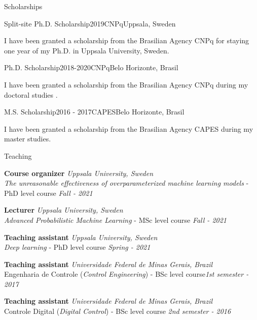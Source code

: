 \documentclass{resume} %
\begin{document}
\newpage

\begin{rSection}{Scholarships}

\begin{rSubsection}{Split-site Ph.D. Scholarship}{2019}{CNPq}{Uppsala, Sweden}

\item I have been granted a scholarship from the Brasilian Agency CNPq for staying one year  of my Ph.D. in Uppsala University, Sweden.
\end{rSubsection}


\begin{rSubsection}{Ph.D. Scholarship}{2018-2020}{CNPq}{Belo Horizonte, Brasil}

\item I have been granted a scholarship from the Brasilian Agency CNPq during my doctoral studies .
\end{rSubsection}


\begin{rSubsection}{M.S. Scholarship}{2016 - 2017}{CAPES}{Belo Horizonte, Brasil}

\item  I have been granted a scholarship from the Brasilian Agency CAPES during my master studies.
\end{rSubsection}


\end{rSection}


\begin{rSection}{Teaching}

{\bf Course organizer}  \hfill {\em Uppsala University, Sweden}\\
\textit{The unreasonable effectiveness of overparameterized machine learning models}  -  PhD level course \hfill {\em Fall - 2021}

{\bf Lecturer}  \hfill {\em Uppsala University, Sweden}\\
\textit{Advanced Probabilistic Machine Learning}  -  MSc level course \hfill {\em Fall - 2021}


{\bf Teaching assistant}  \hfill {\em Uppsala University, Sweden}\\
\textit{Deep learning}  -  PhD level course \hfill {\em Spring - 2021}

{\bf Teaching assistant}  \hfill {\em Universidade Federal de Minas Gerais, Brazil}\\
Engenharia de Controle  (\textit{Control Engineering}) -  BSc level course\hfill {\em 1st semester - 2017}


{\bf Teaching assistant}  \hfill {\em Universidade Federal de Minas Gerais, Brazil}\\
Controle Digital  (\textit{Digital Control})  -  BSc level course \hfill {\em 2nd semester - 2016}


\end{rSection}
\end{document}
